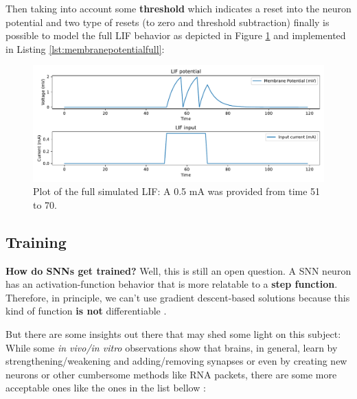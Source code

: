  			\par Then taking into account some \textbf{threshold} which indicates a reset into the neuron potential and two type of resets (to zero and threshold subtraction) finally is possible to model the full LIF  behavior as depicted in Figure \ref{fig:membranepotentialfull} and implemented in Listing \ref{lst:membranepotentialfull}:
 			
 			
 			
 			\begin{figure}[H]
 				\centering
 				\includegraphics[width=\linewidth]{images/membranePotentialFull}
 				\caption{Plot of the full simulated LIF: A 0.5 mA was provided from time 51 to 70.}
 				\label{fig:membranepotentialfull}
 			\end{figure}
 			
 	\subsection{Training}
 	
		\par \textbf{How do SNNs get trained?} Well, this is still an open question. A SNN neuron has an activation-function behavior that is more relatable to a \textbf{step function}. Therefore, in principle, we can't use gradient descent-based solutions because this kind of function \textbf{is not} differentiable \cite{kasabov2019time}.
		
		\par But there are some insights out there that may shed some light on this subject: While some \textit{in vivo/in vitro} observations show that brains, in general, learn by strengthening/weakening and adding/removing synapses or even by creating new neurons or other cumbersome methods like RNA packets, there are some more acceptable ones like the ones in the list bellow \cite{kasabov2019time}:
 	
